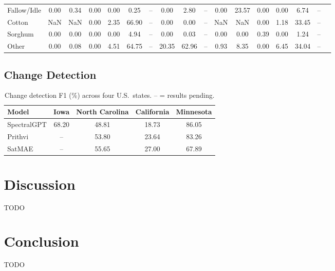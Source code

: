 \documentclass[sigconf]{acmart}
\begin{document}
\begin{table}[t]
{\begin{tabular}{lcccccccccccccccc}
Fallow/Idle        & 0.00  & 0.34  & 0.00 & 0.00  & 0.25  & -- & 0.00  & 2.80  & -- & 0.00  & 23.57 & 0.00 & 0.00  & 6.74  & -- \\
Cotton             & NaN   & NaN   & 0.00 & 2.35  & 66.90 & -- & 0.00  & 0.00  & -- & NaN   & NaN   & 0.00 & 1.18  & 33.45 & -- \\
Sorghum            & 0.00  & 0.00  & 0.00 & 0.00  & 4.94  & -- & 0.00  & 0.03  & -- & 0.00  & 0.00  & 0.39 & 0.00  & 1.24  & -- \\
Other              & 0.00  & 0.08  & 0.00 & 4.51  & 64.75 & -- & 20.35 & 62.96 & -- & 0.93  & 8.35  & 0.00 & 6.45  & 34.04 & -- \\
\bottomrule
\end{tabular}}
\end{table}


\subsection{Change Detection}

\begin{table}[t]
\centering
\caption{Change detection F1 (\%) across four U.S.\ states. -- = results pending.}
\label{tab:cd_results}
\begin{tabular}{lcccc}
\toprule
\textbf{Model} & \textbf{Iowa} & \textbf{North Carolina} & \textbf{California} & \textbf{Minnesota} \\
\midrule
SpectralGPT & 68.20 & 48.81 & 18.73 & 86.05 \\
Prithvi     & --    & 53.80 & 23.64 & 83.26 \\
SatMAE      & --    & 55.65 & 27.00 & 67.89 \\
\bottomrule
\end{tabular}
\end{table}


\section{Discussion}

TODO


\section{Conclusion}

TODO









\end{document}
